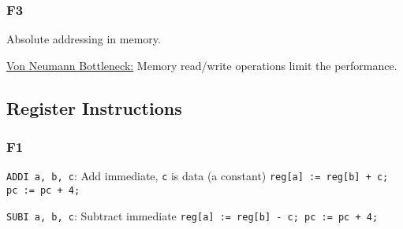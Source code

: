 \subsubsection*{F3}

\par{
	\noindent
	Absolute addressing in memory.
	\begin{figure}[!htb]
	\end{figure}
}

\par{
	\noindent
	\underline{Von Neumann Bottleneck:}	Memory read/write operations limit the performance.	
}

\clearpage

\subsection*{Register Instructions}

\subsubsection*{F1}

\par{
	\noindent
	\texttt{ADDI a, b, c}: Add immediate, \texttt{c} is data (a constant) \newline
	\texttt{reg[a] := reg[b] + c; pc := pc + 4;}
}

\par{
	\noindent
	\texttt{SUBI a, b, c}: Subtract immediate \newline
	\texttt{reg[a] := reg[b] - c; pc := pc + 4;}
}

